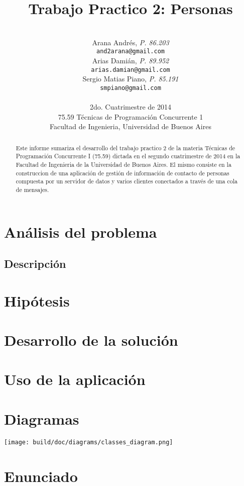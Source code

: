 \documentclass[a4paper,10pt]{article}
\title{\textbf{Trabajo Practico 2: Personas}}
\author{\\
  Arana Andrés, \textit{P. 86.203}                                 \\
  \texttt{and2arana@gmail.com}                                     \\ [2.5ex]
  Arias Damián, \textit{P. 89.952}                                 \\
  \texttt{arias.damian@gmail.com}                                  \\ [2.5ex]
  Sergio Matias Piano, \textit{P. 85.191}                          \\
  \texttt{smpiano@gmail.com}                                       \\ [2.5ex]
                                                                   \\
  \normalsize{2do. Cuatrimestre de 2014}                           \\
  \normalsize{75.59 Técnicas de Programación Concurrente 1}        \\
  \normalsize{Facultad de Ingenieria, Universidad de Buenos Aires} \\
}
\date{}
\begin{document}
\thispagestyle{empty}
\maketitle

\begin{abstract}

  Este informe sumariza el desarrollo del trabajo practico 2 de la materia
  Técnicas de Programación Concurrente I (75.59) dictada en el segundo
  cuatrimestre de 2014 en la Facultad de Ingenieria de la Universidad de Buenos
  Aires. El mismo consiste en la construccion de una aplicación de gestión de
  información de contacto de personas compuesta por un servidor de datos y
  varios clientes conectados a través de una cola de mensajes.

\end{abstract}

\clearpage

\tableofcontents
\clearpage




\section{Análisis del problema}

\subsection{Descripción}

\section{Hipótesis}

\clearpage
\section{Desarrollo de la solución}

\clearpage
\section{Uso de la aplicación}

\clearpage
\section{Diagramas}
\texttt{[image: build/doc/diagrams/classes\_diagram.png]}

\clearpage
\section{Enunciado}

\end{document}
